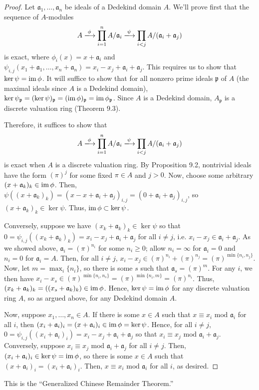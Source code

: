 \begin{proof}
Let $\mathfrak{a}_1, \ldots, \mathfrak{a}_n$ be ideals of a Dedekind domain $A$. We'll prove first that the sequence of $A$-modules
$$A \xlongrightarrow{\phi} \prod_{i=1}^n A/\mathfrak{a}_i \xlongrightarrow{\psi} \prod_{i < j} A/(\mathfrak{a}_i + \mathfrak{a}_j)$$
is exact, where $\phi_i(x) = x + \mathfrak{a}_i$ and 
$\psi_{i,j}(x_1 + \mathfrak{a}_1,\ldots,x_n + \mathfrak{a}_n) = x_i - x_j + \mathfrak{a}_i + \mathfrak{a}_j$. This requires us to show
that $\ker \psi = \operatorname{im} \phi$. It will suffice to show that for all nonzero prime ideals $\mathfrak{p}$ of $A$ (the maximal ideals since 
$A$ is a Dedekind domain), $\ker \psi_{\mathfrak{p}} = (\ker \psi)_{\mathfrak{p}} = (\operatorname{im} \phi)_{\mathfrak{p}} = \operatorname{im} \phi_{\mathfrak{p}}$.
Since $A$ is a Dedekind domain, $A_{\mathfrak{p}}$ is a discrete valuation ring (Theorem 9.3). 

Therefore, it suffices to show that
$$A \xlongrightarrow{\phi} \prod_{i=1}^n A/\mathfrak{a}_i \xlongrightarrow{\psi} \prod_{i < j} A/(\mathfrak{a}_i + \mathfrak{a}_j)$$
is exact when $A$ is a discrete valuation ring. By Proposition 9.2, nontrivial ideals have the form $(\pi)^j$ for some fixed $\pi \in A$
and $j > 0$. Now, choose some arbitrary $(x + \mathfrak{a}_k)_k \in \operatorname{im} \phi$. Then, 
$\psi((x + \mathfrak{a}_k)_k) = (x - x + \mathfrak{a}_i + \mathfrak{a}_j)_{i,j} = (0 + \mathfrak{a}_i + \mathfrak{a}_j)_{i,j}$, so
$(x + \mathfrak{a}_k)_k \in \ker \psi$. Thus, $\operatorname{im} \phi \subset \ker \psi$.

Conversely, suppose we have $(x_k + \mathfrak{a}_k)_k \in \ker \psi$ so that 
$0 = \psi_{i,j}((x_k + \mathfrak{a}_k)_k) = x_i - x_j + \mathfrak{a}_i + \mathfrak{a}_j$ for all $i \neq j$,
i.e. $x_i - x_j \in \mathfrak{a}_i + \mathfrak{a}_j$. As we showed above, $\mathfrak{a}_i = (\pi)^{n_i}$ for some 
$n_i \ge 0$; allow $n_i = \infty$ for $\mathfrak{a}_i = 0$ and $n_i = 0$ for $\mathfrak{a}_i = A$. Then, for all $i \neq j$, 
$x_i - x_j \in (\pi)^{n_i} + (\pi)^{n_j} = (\pi)^{\min\{n_i,n_j\}}$. Now, let $m = \max_i\{n_i\}$, so there is some $s$ such that
$\mathfrak{a}_s = (\pi)^m$. For any $i$, we then have $x_i - x_s \in (\pi)^{\min\{n_i,n_s\}} = (\pi)^{\min\{n_i,m\}} = (\pi)^{n_i}$. 
Thus, $(x_k + \mathfrak{a}_k)_k = ((x_s + \mathfrak{a}_k)_k) \in \operatorname{im} \phi$. Hence, $\ker \psi = \operatorname{im} \phi$ for any discrete valuation 
ring $A$, so as argued above, for any Dedekind domain $A$.

Now, suppose $x_1,\ldots,x_n \in A$. If there is some $x \in A$ such that $x \equiv x_i \text{ mod } \mathfrak{a}_i$ for all $i$, then
$(x_i + \mathfrak{a}_i)_i = (x + \mathfrak{a}_i)_i \in \operatorname{im} \phi = \ker \psi$. Hence, for all $i \neq j$, $0 = \psi_{i,j}((x_i + \mathfrak{a}_i)_i)
= x_i - x_j + \mathfrak{a}_i + \mathfrak{a}_j$ so that $x_i \equiv x_j \text{ mod } \mathfrak{a}_i + \mathfrak{a}_j$. Conversely, suppose
$x_i \equiv x_j \text{ mod } \mathfrak{a}_i + \mathfrak{a}_j$ for all $i \neq j$. Then, $(x_i + \mathfrak{a}_i)_i \in \ker \psi = \operatorname{im} \phi$,
so there is some $x \in A$ such that $(x + \mathfrak{a}_i)_i = (x_i + \mathfrak{a}_i)_i$. Then, $x \equiv x_i \text{ mod } \mathfrak{a}_i$ 
for all $i$, as desired.
\end{proof}

\begin{remark}
This is the ``Generalized Chinese Remainder Theorem.''
\end{remark}

